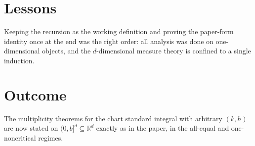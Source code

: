 \documentclass[11pt]{article}
\begin{document}
\section{Lessons}
Keeping the recursion as the working definition and proving the paper-form identity once at the end
was the right order: all analysis was done on one-dimensional objects, and the $d$-dimensional
measure theory is confined to a single induction.

\section{Outcome}
The multiplicity theorems for the chart standard integral with arbitrary $(k,h)$ are now stated on
$(0,b]^d\subseteq\mathbb R^d$ exactly as in the paper, in the all-equal and one-noncritical regimes.
\end{document}
